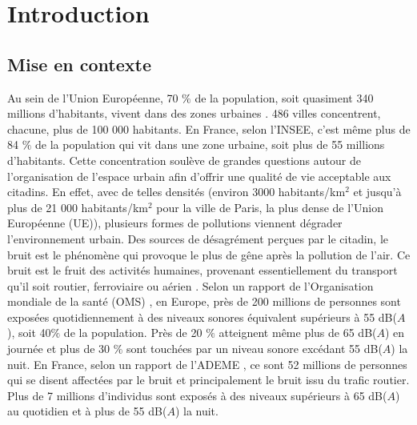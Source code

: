 
\chapter*{Introduction}
\label{chap:intro}


\section{Mise en contexte}
Au sein de l'Union Européenne, 70 $\%$ de la population, soit quasiment 340 millions d'habitants, vivent dans des zones urbaines \cite{europ-commission_data_2017}. 486 villes concentrent, chacune, plus de 100 000 habitants. En France, selon l'INSEE, c'est même plus de 84 $\%$ de la population qui vit dans une zone urbaine, soit plus de 55 millions d'habitants. Cette concentration soulève de grandes questions autour de l'organisation de l'espace urbain afin d'offrir une qualité de vie acceptable aux citadins. En effet, avec de telles densités (environ 3000 habitants/km$^2$ et jusqu'à plus de 21 000  habitants/km$^2$ pour la ville de Paris, la plus dense de l'Union Européenne (UE)), plusieurs formes de pollutions viennent dégrader l'environnement urbain. Des sources de désagrément perçues par le citadin, le bruit est le phénomène qui provoque le plus de gêne après la pollution de l'air. Ce bruit est le fruit des activités humaines, provenant essentiellement du transport qu'il soit routier, ferroviaire ou aérien \cite{zannin_characterization_2013}.
Selon un rapport de l'Organisation mondiale de la santé (OMS) \cite{who_burden_2017}, en Europe, près de 200 millions de personnes sont exposées quotidiennement à des niveaux sonores équivalent supérieurs à 55 dB($A$), soit 40$\%$ de la population. Près de 20 $\%$ atteignent même plus de 65 dB($A$) en journée et plus de 30 $\%$ sont touchées par un niveau sonore excédant 55 dB($A$) la nuit. En France, selon un rapport de l'ADEME \cite{europeens2016analyse}, ce sont 52 millions de personnes qui se disent affectées par le bruit et principalement le bruit issu du trafic routier. Plus de 7 millions d'individus sont exposés à des niveaux supérieurs à 65 dB($A$) au quotidien et à plus de 55 dB($A$) la nuit.
